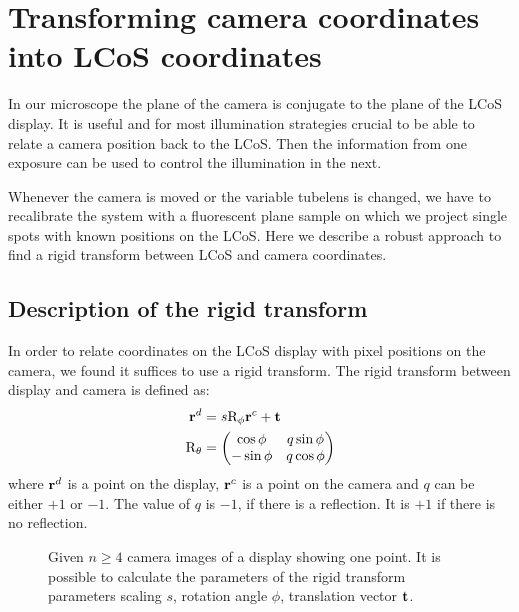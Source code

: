 \chapter{Transforming camera coordinates into LCoS coordinates}
\label{sec:rigid}
\begin{summary}
  In our microscope the plane of the camera is conjugate to the plane
  of the LCoS display. It is useful and for most illumination
  strategies crucial to be able to relate a camera position back to
  the LCoS. Then the information from one exposure can be used to
  control the illumination in the next.

  Whenever the camera is moved or the variable tubelens is changed, we
  have to recalibrate the system with a fluorescent plane sample on
  which we project single spots with known positions on the LCoS. Here
  we describe a robust approach to find a rigid transform between LCoS
  and camera coordinates.
\end{summary}
\section{Description of the rigid transform}
In order to relate coordinates on the LCoS display with pixel
positions on the camera, we found it suffices to use a rigid
transform. The rigid transform between display and camera is defined
as:
\begin{align}
  \mathbf{r}^d&=s \textrm{R}_\phi \mathbf{r}^c + \mathbf{t}\\
  \textrm{R}_\theta&=\begin{pmatrix}
  \cos\phi & q\sin\phi \\
  -\sin\phi & q\cos\phi \\ 
  \end{pmatrix}
\end{align}
where $\mathbf{r}^d$ is a point on the display, $\mathbf{r}^c$ is a point on the
camera and $q$ can be either $+1$ or $-1$. The value of $q$ is $-1$,
if there is a reflection. It is $+1$ if there is no reflection.

\begin{figure}[!hbt]
  \centering
  
  \caption{Given $n\ge 4$ camera images of a display showing one
    point.  It is possible to calculate the parameters of the rigid
    transform parameters scaling $s$, rotation angle $\phi$,
    translation vector $\mathbf{t}$.}
  \label{fig:calib-align}
\end{figure}



